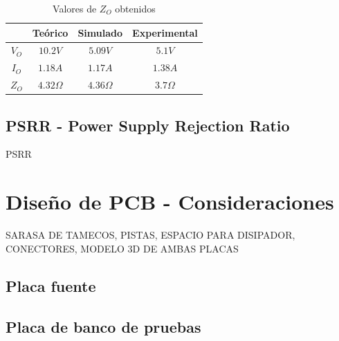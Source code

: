 \begin{table}[!h]

\begin{center}
\begin{tabular}{|c||c|c|c|}
\hline
& Te\'orico & Simulado & Experimental\\
\hline 
$V_O$ & $10.2V$ & $5.09V$ & $5.1V$\\
\hline 
$I_O$ &  $1.18A$    &   $1.17A$     & $1.38A$\\
\hline
$Z_O$ &   $4.32\Omega$   &    $4.36\Omega$    & $3.7\Omega$\\
\hline
\end{tabular}
\end{center}

\caption{Valores de $Z_O$ obtenidos}
\end{table}



\subsection{PSRR - Power Supply Rejection Ratio}
PSRR\\



\section{Dise\~no de PCB - Consideraciones}

SARASA DE TAMECOS, PISTAS, ESPACIO PARA DISIPADOR, CONECTORES, MODELO 3D DE AMBAS PLACAS

\subsection{Placa fuente}

\subsection{Placa de banco de pruebas}

